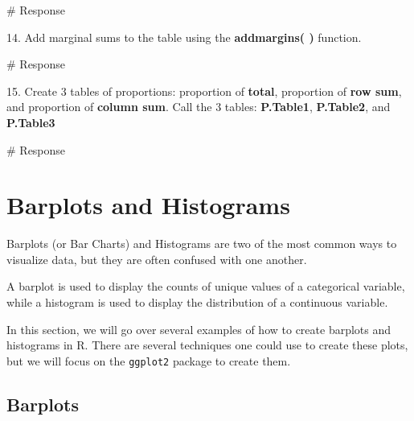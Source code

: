 \documentclass[
  letterpaper,
  DIV=11,
  numbers=noendperiod]{scrreprt}
\newenvironment{Shaded}{\begin{snugshade}}{\end{snugshade}}
\newcommand{\CommentTok}[1]{\textcolor[rgb]{0.37,0.37,0.37}{#1}}
\begin{document}
\begin{Shaded}
\begin{Highlighting}[]
\CommentTok{\# Response}
\end{Highlighting}
\end{Shaded}

14. Add marginal sums to the table using the \textbf{addmargins( )}
function.

\begin{Shaded}
\begin{Highlighting}[]
\CommentTok{\# Response}
\end{Highlighting}
\end{Shaded}

15. Create 3 tables of proportions: proportion of \textbf{total},
proportion of \textbf{row sum}, and proportion of \textbf{column sum}.
Call the 3 tables: \textbf{P.Table1}, \textbf{P.Table2}, and
\textbf{P.Table3}

\begin{Shaded}
\begin{Highlighting}[]
\CommentTok{\# Response}
\end{Highlighting}
\end{Shaded}


\chapter*{Barplots and Histograms}\label{barplots-and-histograms}


Barplots (or Bar Charts) and Histograms are two of the most common ways
to visualize data, but they are often confused with one another.

A barplot is used to display the counts of unique values of a
categorical variable, while a histogram is used to display the
distribution of a continuous variable.

In this section, we will go over several examples of how to create
barplots and histograms in R. There are several techniques one could use
to create these plots, but we will focus on the \texttt{ggplot2} package
to create them.

\section*{Barplots}\label{barplots}
\end{document}
